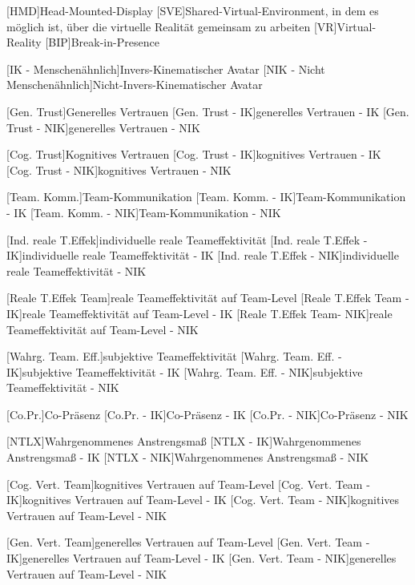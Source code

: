 \begin{acronym}
	[HMD]{Head-Mounted-Display}
	[SVE]{Shared-Virtual-Environment, in dem es möglich ist, über die virtuelle Realität gemeinsam zu arbeiten}
	[VR]{Virtual-Reality}
	[BIP]{Break-in-Presence}
	
	[IK - Menschenähnlich]{Invers-Kinematischer Avatar}
	[NIK - Nicht Menschenähnlich]{Nicht-Invers-Kinematischer Avatar}
	
	[Gen. Trust]{Generelles Vertrauen}
	[Gen. Trust - IK]{generelles Vertrauen - IK}
	[Gen. Trust - NIK]{generelles Vertrauen - NIK}
	
	[Cog. Trust]{Kognitives Vertrauen}
	[Cog. Trust - IK]{kognitives Vertrauen - IK}
	[Cog. Trust - NIK]{kognitives Vertrauen - NIK}
	
	[Team. Komm.]{Team-Kommunikation}
	[Team. Komm. - IK]{Team-Kommunikation - IK}
	[Team. Komm. - NIK]{Team-Kommunikation - NIK}
	
	[Ind. reale T.Effek]{individuelle reale Teameffektivität}
	[Ind. reale T.Effek - IK]{individuelle reale Teameffektivität - IK}
	[Ind. reale T.Effek - NIK]{individuelle reale Teameffektivität - NIK}	
	
	[Reale T.Effek Team]{reale Teameffektivität auf Team-Level}
	[Reale T.Effek Team - IK]{reale Teameffektivität auf Team-Level - IK}
	[Reale T.Effek Team- NIK]{reale Teameffektivität auf Team-Level - NIK}
	
	[Wahrg. Team. Eff.]{subjektive Teameffektivität}
	[Wahrg. Team. Eff. - IK]{subjektive Teameffektivität - IK}
	[Wahrg. Team. Eff. - NIK]{subjektive Teameffektivität - NIK}
	
	[Co.Pr.]{Co-Präsenz}
	[Co.Pr. - IK]{Co-Präsenz - IK}
	[Co.Pr. - NIK]{Co-Präsenz - NIK}
	
	[NTLX]{Wahrgenommenes Anstrengsmaß}
	[NTLX - IK]{Wahrgenommenes Anstrengsmaß - IK}
	[NTLX - NIK]{Wahrgenommenes Anstrengsmaß - NIK}
	
	[Cog. Vert. Team]{kognitives Vertrauen auf Team-Level}
	[Cog. Vert. Team - IK]{kognitives Vertrauen auf Team-Level - IK}
	[Cog. Vert. Team - NIK]{kognitives Vertrauen auf Team-Level - NIK}
	
	[Gen. Vert. Team]{generelles Vertrauen auf Team-Level}
	[Gen. Vert. Team - IK]{generelles Vertrauen auf Team-Level - IK}
	[Gen. Vert. Team - NIK]{generelles Vertrauen auf Team-Level - NIK}
	

\end{acronym}
